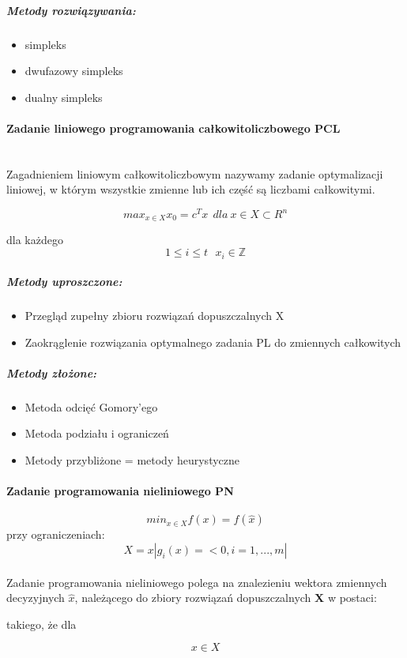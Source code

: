 \documentclass[a4paper,twoside]{report}
\begin{document}
\subparagraph{Metody rozwiązywania:}
\begin{itemize}
\item simpleks
\item dwufazowy simpleks
\item dualny simpleks
\end{itemize} 
 
\paragraph{Zadanie liniowego programowania całkowitoliczbowego PCL\\\\}

Zagadnieniem liniowym całkowitoliczbowym nazywamy zadanie optymalizacji
liniowej, w którym wszystkie zmienne lub ich część są liczbami całkowitymi.

\[max_{x \in X} x_0 = c^Tx~~dla~x \in X \subset R^n\]


dla każdego $$1 \le i \le t~~~x_i \in \mathbb{Z}$$

\subparagraph{Metody uproszczone:}
\begin{itemize}
\item Przegląd zupełny zbioru rozwiązań dopuszczalnych X
\item Zaokrąglenie rozwiązania optymalnego zadania PL do zmiennych całkowitych
\end{itemize}

\subparagraph{Metody złożone:}
\begin{itemize}
\item Metoda odcięć Gomory'ego
\item Metoda podziału i ograniczeń
\item Metody przybliżone = metody heurystyczne
\end{itemize}


\paragraph{Zadanie programowania nieliniowego PN}

$$min_{x \in X} f(x) = f(\hat{x})$$
przy ograniczeniach:
$$X={x|g_i(x)=<0, i=1,...,m|}$$ 
\\
Zadanie programowania nieliniowego polega na znalezieniu wektora zmiennych decyzyjnych $\hat{x}$, należącego do zbiory rozwiązań dopuszczalnych \textbf{X} w postaci: 

takiego, że dla

$$x \in X$$
\end{document}
